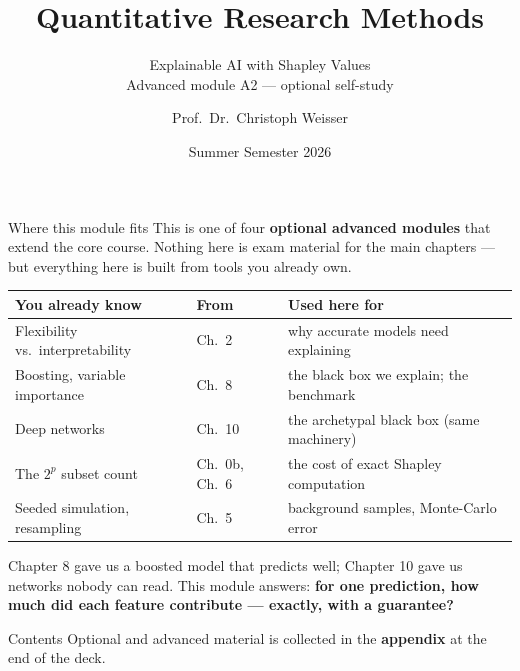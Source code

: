 \documentclass[aspectratio=169,11pt]{beamer}
\title{Quantitative Research Methods}
\subtitle{Explainable AI with Shapley Values\\[2pt]{\small Advanced module A2 --- optional self-study}}
\author{Prof.\ Dr.\ Christoph Weisser}\institute{HSBI}
\date{Summer Semester 2026}\graphicspath{{images/}}
\begin{document}
\begin{frame}[plain]\titlepage\end{frame}

\begin{frame}{Where this module fits}
  \footnotesize
  This is one of four \textbf{optional advanced modules} that extend the core course.
  Nothing here is exam material for the main chapters --- but everything here is built
  from tools you already own.
  \begin{center}
  \begin{tabular}{@{}lll@{}}
    \toprule
    \textbf{You already know} & \textbf{From} & \textbf{Used here for} \\
    \midrule
    Flexibility vs.\ interpretability & Ch.\ 2 & why accurate models need explaining \\
    Boosting, variable importance & Ch.\ 8 & the black box we explain; the benchmark \\
    Deep networks & Ch.\ 10 & the archetypal black box (same machinery) \\
    The $2^p$ subset count & Ch.\ 0b, Ch.\ 6 & the cost of exact Shapley computation \\
    Seeded simulation, resampling & Ch.\ 5 & background samples, Monte-Carlo error \\
    \bottomrule
  \end{tabular}
  \end{center}
  \vspace{2pt}
  \begin{takeaway}
    Chapter 8 gave us a boosted model that predicts well; Chapter 10 gave us networks
    nobody can read. This module answers: \textbf{for one prediction, how much did each
    feature contribute --- exactly, with a guarantee?}
  \end{takeaway}
\end{frame}

\begin{frame}{Contents}\small\tableofcontents[hideallsubsections]
  \vfill
  {\tiny Optional and advanced material is collected in the \textbf{appendix} at the end of the deck.}
\end{frame}
\end{document}
